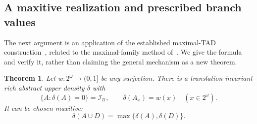 \documentclass[11pt,a4paper]{article}
\newtheorem{theorem}{Theorem}[section]
\theoremstyle{definition}
\theoremstyle{remark}
\newcommand{\I}{\mathcal I}
\newcommand{\U}{\mathcal U}
\begin{document}
\subsection{A maxitive realization and prescribed branch values}
The next argument is an application of the established maximal-TAD
construction~\cite[Theorem~3.1]{FT}, related to the maximal-family method
of~\cite{DNJ}. We give the formula and verify it, rather than claiming
the general mechanism as a new theorem.

\begin{theorem}
\label{thm:density}
Let $w:2^\omega\to(0,1]$ be any surjection. There is a translation-invariant
rich abstract upper density $\delta$ with
\begin{equation}
\label{eq:exactnull}
          \{A:\delta(A)=0\}=\I_\U,
        \qquad \delta(A_x)=w(x)\quad(x\in2^\omega).
\end{equation}
It can be chosen \emph{maxitive}:
\begin{equation}
\label{eq:maxitive}
                    \delta(A\cup D)=\max\{\delta(A),\delta(D)\}.
\end{equation}
\end{theorem}
\end{document}

